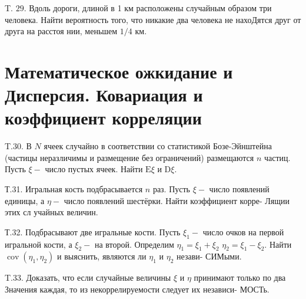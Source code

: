 \documentclass[a4paper,12pt]{article} %
\begin{document}
\begin{example}


T. $29 .$ Вдоль дороги, длиной в 1 км расположены случайным образом три человека. Найти вероятность того, что никакие два человека не нахоДятся друг от друга на расстоя нии, меньшем $1 / 4$ км.



\end{example}


\section{Математическое ожкидание и Дисперсия. Ковариация и коэффициент корреляции}


\begin{example}

T.30. В $N$ ячеек случайно в соответствии со статистикой Бозе-Эйнштейна (частицы неразличимы и размещение без ограничений) размещаются $n$ частиц. Пусть $\xi-$ число пустых ячеек. Найти $\mathrm{E} \xi$ и $\mathrm{D} \xi$.




\end{example}







\begin{example}


Т.31. Игральная кость подбрасывается $n$ раз. Пусть $\xi-$ число появлений единицы, а $\eta-$ число появлений шестёрки. Найти коэффициент корре-
Лящии этих сл учайных величин.



\end{example}



\begin{example}


Т.32. Подбрасывают две игральные кости. Пусть $\xi_{1}-$ число очков на первой игральной кости, а $\xi_{2}-$ на второй. Определим $\eta_{1}=\xi_{1}+\xi_{2}$ $\eta_{2}=\xi_{1}-\xi_{2} .$ Найти $\operatorname{cov}\left(\eta_{1}, \eta_{2}\right)$ и выяснить, являются ли $\eta_{1}$ и $\eta_{2}$ незави-
СИМыми.



\end{example}



\begin{example}

T.33. Доказать, что если случайные величины $\xi$ и $\eta$ принимают только
по два Значения каждая, то из некоррелируемости следует их независи-
МОСТь.




\end{example}
\end{document}
